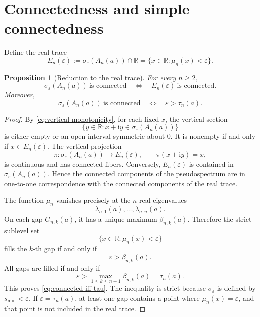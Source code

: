 \documentclass[11pt]{amsart}
\numberwithin{equation}{section}
\newcommand{\R}{\mathbb R}
\newcommand{\eps}{\varepsilon}
\newcommand{\ii}{\mathrm i}
\newcommand{\A}{A}
\newtheorem{proposition}[theorem]{Proposition}
\begin{document}
\section{Connectedness and simple connectedness}

Define the real trace
\[
E_n(\eps)
:=
\sigma_\eps(\A_n(a))\cap\R
=
\{x\in\R:\mu_n(x)<\eps\}.
\tag{4.1}\label{eq:real-trace}
\]

\begin{proposition}[Reduction to the real trace]\label{prop:real-trace}
For every \(n\ge2\),
\[
\sigma_\eps(\A_n(a))\ \text{is connected}
\quad\Longleftrightarrow\quad
E_n(\eps)\ \text{is connected}.
\]
Moreover,
\[
\sigma_\eps(\A_n(a))\ \text{is connected}
\quad\Longleftrightarrow\quad
\eps>\tau_n(a).
\tag{4.2}\label{eq:connected-iff-tau}
\]
\end{proposition}

\begin{proof}
By \eqref{eq:vertical-monotonicity}, for each fixed \(x\), the vertical section
\[
\{y\in\R:x+\ii y\in\sigma_\eps(\A_n(a))\}
\]
is either empty or an open interval symmetric about \(0\).  It is nonempty if and only if \(x\in E_n(\eps)\).  The vertical projection
\[
\pi:\sigma_\eps(\A_n(a))\to E_n(\eps),
\qquad
\pi(x+\ii y)=x,
\]
is continuous and has connected fibers.  Conversely, \(E_n(\eps)\) is contained in \(\sigma_\eps(\A_n(a))\).  Hence the connected components of the pseudospectrum are in one-to-one correspondence with the connected components of the real trace.

The function \(\mu_n\) vanishes precisely at the \(n\) real eigenvalues
\[
\lambda_{n,1}(a),\dots,\lambda_{n,n}(a).
\]
On each gap \(G_{n,k}(a)\), it has a unique maximum \(\beta_{n,k}(a)\).  Therefore the strict sublevel set
\[
\{x\in\R:\mu_n(x)<\eps\}
\]
fills the \(k\)-th gap if and only if
\[
\eps>\beta_{n,k}(a).
\]
All gaps are filled if and only if
\[
\eps>\max_{1\le k\le n-1}\beta_{n,k}(a)=\tau_n(a).
\]
This proves \eqref{eq:connected-iff-tau}.  The inequality is strict because \(\sigma_\eps\) is defined by \(s_{\min}<\eps\).  If \(\eps=\tau_n(a)\), at least one gap contains a point where \(\mu_n(x)=\eps\), and that point is not included in the real trace.
\end{proof}
\end{document}
